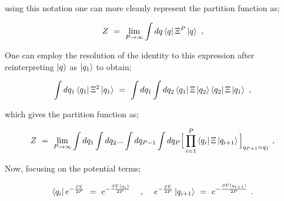 \documentclass[11pt]{article}
\begin{document}
using this notation one can more cleanly represent the partition function as;

\begin{equation} \label{wr-eq-12-1}
Z \hspace{0.125cm} = \hspace{0.125cm}  \lim_{P \rightarrow \infty} \int dq \bra{q} \Xi^P \ket{q} \hspace{0.125cm} , 
\end{equation}

One can employ the resolution of the identity to this expression after reinterpreting \begin{math} \ket{q} \end{math} as \begin{math} \ket{q_1}\end{math} to obtain; 

\begin{equation} \label{wr-eq-13-1}
\int dq_1 \bra{q_1} \Xi^2 \ket{q_1} \hspace{0.125cm} = \hspace{0.125cm} \int dq_1 \int dq_2 \bra{q_1} \Xi \ket{q_2} \bra{q_2} \Xi \ket{q_1} \hspace{0.125cm} , 
\end{equation}

which gives the partition function as;

\begin{equation} \label{wr-eq-14-1}
Z \hspace{0.125cm} = \hspace{0.125cm}  \lim_{P \rightarrow \infty} \int dq_1 \int dq_2 ... \int dq_{P - 1} \int dq_P \Big[ \prod_{i=1}^{P} \bra{q_i} \Xi \ket{q_{i+1}} \Big]_{q_{P+1} = q_1} \hspace{0.125cm} , 
\end{equation}

Now, focusing on the potential terms;

\begin{equation} \label{wr-eq-15-1}
\bra{q_i} e^{-\frac{\beta \hat{V}}{2 P}} \hspace{0.125cm} = \hspace{0.125cm} e^{-\frac{\beta \hat{V}(q_i)}{2 P}} \hspace{0.425cm} , \hspace{0.425cm} e^{-\frac{\beta \hat{V}}{2 P}} \ket{q_{i+1}} \hspace{0.125cm} = \hspace{0.125cm} e^{-\frac{\beta \hat{V}(q_{i+1})}{2 P}} \hspace{0.125cm} .
\end{equation}
\end{document}
